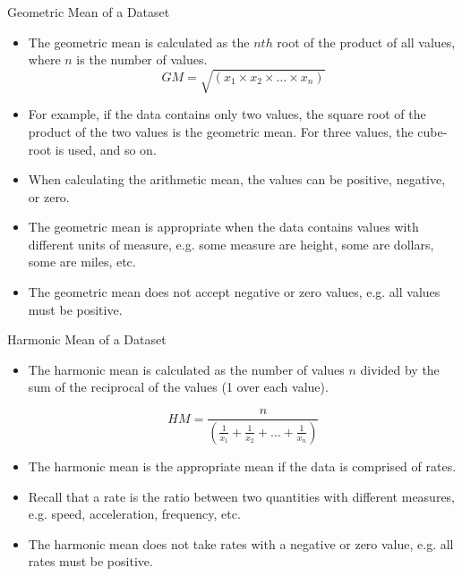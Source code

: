\begin{frame}[t]{Geometric Mean of a Dataset}
	\begin{itemize}
		\item The geometric mean is calculated as the $nth$ root of the 
		product 
		of all values, where $n$ is the number of values. 
		$$GM = 
		\sqrt{(x_1\times  x_2 \times … \times x_n)}$$
		
		\item For example, if the data contains only two values, the square 
		root of the product of the two values is the geometric mean. For three 
		values, the cube-root is used, and so on.
		\item When calculating the arithmetic mean, the values can be positive, 
		negative, or zero.
		
		\item The geometric mean is appropriate when the data contains values 
		with different units of measure, e.g. some measure are height, some are 
		dollars, some are miles, etc.
		\item The geometric mean does not accept negative or zero values, e.g. 
		all values must be positive.
	\end{itemize}
\end{frame}


\begin{frame}[t]{Harmonic Mean of a Dataset}
	\begin{itemize}
		\item The harmonic mean is calculated as the number of values $n$ 
		divided 
		by the sum of the reciprocal of the values (1 over each value).
		
		$$HM =  \frac{n}{(\frac{1}{x_1} + \frac{1}{x_2} + … + \frac{1}{x_n})}$$
		\item The harmonic mean is the appropriate mean if the data is 
		comprised of rates.
		
		\item Recall that a rate is the ratio between two quantities with 
		different measures, e.g. speed, acceleration, frequency, etc.
		\item The harmonic mean does not take rates with a negative or zero 
		value, e.g. all rates must be positive.
	\end{itemize}
\end{frame}



